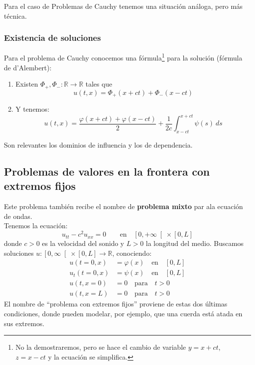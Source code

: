 \noindent
Para el caso de Problemas de Cauchy tenemos una situación análoga, pero más técnica.

\subsubsection{Existencia de soluciones}
\noindent
Para el problema de Cauchy conocemos una fórmula\footnote{No la demostraremos, pero se hace el cambio de variable $y=x+ct$, $z=x-ct$ y la ecuación se simplifica.} para la solución (fórmula de d'Alembert):
\begin{enumerate}[label=\alph*)]
    \item Existen $\Phi_+,\Phi_-:\mathbb{R}\to\mathbb{R}$ tales que
        \begin{equation*}
            u(t,x) = \Phi_+(x+ct) + \Phi_-(x-ct)
        \end{equation*}
    \item Y tenemos:
        \begin{equation*}
            u(t,x) = \frac{\varphi(x+ct)+\varphi(x-ct)}{2} + \frac{1}{2c} \int_{x-ct}^{x+ct} \psi(s)~ds 
        \end{equation*}
\end{enumerate}
Son relevantes los dominios de influencia y los de dependencia.

\subsection{Problemas de valores en la frontera con extremos fijos}
\noindent
Este problema también recibe el nombre de \textbf{problema mixto} par ala ecuación de ondas.\\

\noindent
Tenemos la ecuación:
\begin{equation*}
    u_{tt} - c^2 u_{xx} = 0 \qquad \text{en} \quad \left[0,+\infty\right[\times [0,L]
\end{equation*}
donde $c>0$ es la velocidad del sonido y $L>0$ la longitud del medio. Buscamos soluciones $u:\left[0,\infty\right[\times[0,L]\to \mathbb{R}$, conociendo:
\begin{align*}
    u(t=0,x) &= \varphi(x) \quad \text{en} \quad [0,L] \\
    u_t(t=0,x) &= \psi(x) \quad \text{en} \quad [0,L] \\
    u(t,x=0) &= 0 \quad \text{para} \quad t > 0 \\
    u(t,x=L) &= 0  \quad \text{para} \quad  t > 0 
\end{align*}
El nombre de ``problema con extremos fijos'' proviene de estas dos últimas condiciones, donde pueden modelar, por ejemplo, que una cuerda está atada en sus extremos.\\

